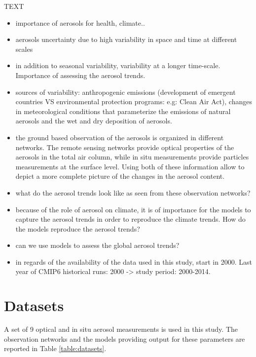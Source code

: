 \documentclass[journal abbreviation, manuscript]{copernicus}
\begin{document}
\introduction  %
TEXT
\begin{itemize}
 \item importance of aerosols for health, climate..
 \item aerosols uncertainty due to high variability in space and time at different scales
 \item in addition to seasonal variability, variability at a longer time-scale. Importance of assessing the aerosol trends.
 \item sources of variability: anthropogenic emissions (development of emergent countries VS environmental protection programs: e.g: Clean Air Act), changes in meteorological conditions that parameterize the emissions of natural aerosols and the wet and dry deposition of aerosols.
 \item the ground based observation of the aerosols is organized in different networks. The remote sensing networks provide optical properties of the aerosols in the total air column, while in situ measurements provide particles measurements at the surface level. Using both of these information allow to depict a more complete picture of the changes in the aerosol content.
 \item what do the aerosol trends look like as seen from these observation networks?
 \item because of the role of aerosol on climate, it is of importance for the models to capture the aerosol trends in order to reproduce the climate trends. How do the models reproduce the aerosol trends?
 \item can we use models to assess the global aerosol trends?
 \item in regards of the availability of the data used in this study, start in 2000. Last year of CMIP6 historical runs: 2000 -> study period: 2000-2014.
\end{itemize}


\section{Datasets}

A set of 9 optical and in situ aerosol measurements is used in this study. The observation networks and the models providing output for these parameters are reported in Table \ref{table:datasets}.
\end{document}
